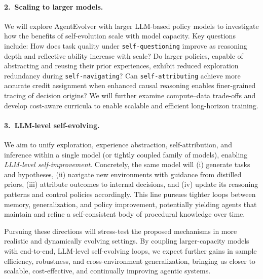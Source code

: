 \paragraph{2.\ Scaling to larger models.}
We will explore AgentEvolver with larger LLM-based policy models to investigate how the benefits of self-evolution scale with model capacity. Key questions include: How does task quality under \texttt{self-questioning} improve as reasoning depth and reflective ability increase with scale? Do larger policies, capable of abstracting and reusing their prior experiences, exhibit reduced exploration redundancy during \texttt{self-navigating}? Can \texttt{self-attributing} achieve more accurate credit assignment when enhanced causal reasoning enables finer-grained tracing of decision origins? We will further examine compute–data trade-offs and develop cost-aware curricula to enable scalable and efficient long-horizon training.

\paragraph{3.\ LLM-level self-evolving.}
We aim to unify exploration, experience abstraction, self-attribution, and inference within a single model (or tightly coupled family of models), enabling \emph{LLM-level self-improvement}. Concretely, the same model will (i) generate tasks and hypotheses, (ii) navigate new environments with guidance from distilled priors, (iii) attribute outcomes to internal decisions, and (iv) update its reasoning patterns and control policies accordingly. This line pursues tighter loops between memory, generalization, and policy improvement, potentially yielding agents that maintain and refine a self-consistent body of procedural knowledge over time.

\medskip
Pursuing these directions will stress-test the proposed mechanisms in more realistic and dynamically evolving settings. By coupling larger-capacity models with end-to-end, LLM-level self-evolving loops, we expect further gains in sample efficiency, robustness, and cross-environment generalization, bringing us closer to scalable, cost-effective, and continually improving agentic systems.
